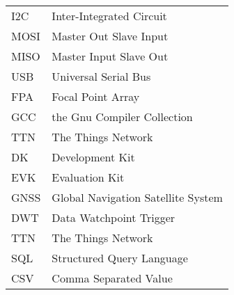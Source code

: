 \begin{flushleft}
\begin{longtable}[l]{p{2.5cm}l}
        I2C     & Inter-Integrated Circuit\\
        MOSI    & Master Out Slave Input\\
        MISO    & Master Input Slave Out \\
        USB     & Universal Serial Bus\\
        FPA     & Focal Point Array\\
        GCC     & the Gnu Compiler Collection\\
        TTN     & The Things Network\\
        DK      & Development Kit\\
        EVK     & Evaluation Kit\\
        GNSS    & Global Navigation Satellite System\\
        DWT     & Data Watchpoint Trigger\\
        TTN     & The Things Network\\
        SQL     & Structured Query Language\\
        CSV     & Comma Separated Value
\end{longtable}
\end{flushleft}
\endgroup
